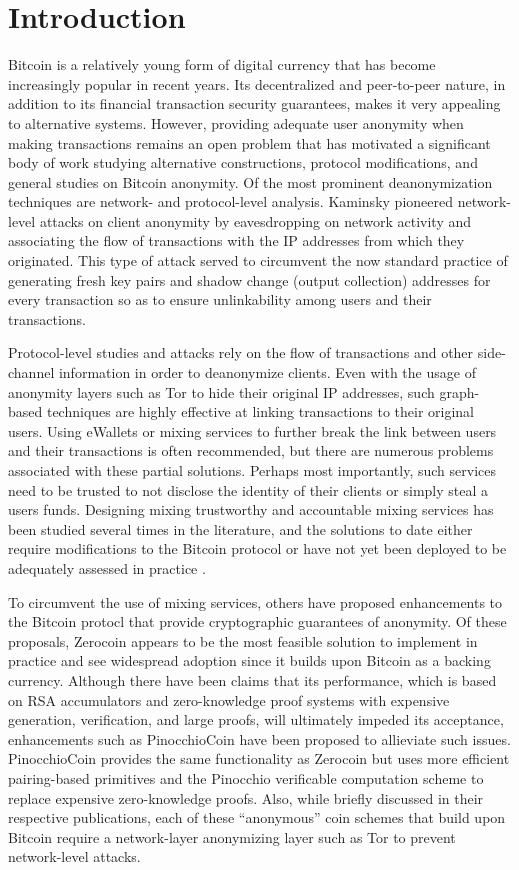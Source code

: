 \section{Introduction}
Bitcoin is a relatively young form of digital currency that has become increasingly popular in recent years. Its decentralized and peer-to-peer nature, in addition to its financial transaction security guarantees, makes it very appealing to alternative systems. However, providing adequate user anonymity when making transactions remains an open problem that has motivated a significant body of work studying alternative constructions, protocol modifications, and general studies on Bitcoin anonymity. Of the most prominent deanonymization techniques are network- and protocol-level analysis. Kaminsky \cite{kaminsky} pioneered network-level attacks on client anonymity by eavesdropping on network activity and associating the flow of transactions with the IP addresses from which they originated. This type of attack served to circumvent the now standard practice of generating fresh key pairs and shadow change (output collection) addresses for every transaction so as to ensure unlinkability among users and their transactions. 

Protocol-level studies and attacks rely on the flow of transactions and other side-channel information in order to deanonymize clients. Even with the usage of anonymity layers such as Tor to hide their original IP addresses, such graph-based techniques are highly effective at linking transactions to their original users. Using eWallets or mixing services to further break the link between users and their transactions is often recommended, but there are numerous problems associated with these partial solutions. Perhaps most importantly, such services need to be trusted to not disclose the identity of their clients or simply steal a users funds. Designing mixing trustworthy and accountable mixing services has been studied several times in the literature, and the solutions to date either require modifications to the Bitcoin protocol \cite{BitterToBetter} or have not yet been deployed to be adequately assessed in practice \cite{mixcoin}.

To circumvent the use of mixing services, others have proposed enhancements to the Bitcoin protocl that provide cryptographic guarantees of anonymity. Of these proposals, Zerocoin \cite{zerocoin} appears to be the most feasible solution to implement in practice and see widespread adoption since it builds upon Bitcoin as a backing currency. Although there have been claims that its performance, which is based on RSA accumulators and zero-knowledge proof systems with expensive generation, verification, and large proofs, will ultimately impeded its acceptance, enhancements such as PinocchioCoin \cite{pinocchio} have been proposed to allieviate such issues. PinocchioCoin provides the same functionality as Zerocoin but uses more efficient pairing-based primitives and the Pinocchio verificable computation scheme to replace expensive zero-knowledge proofs. Also, while briefly discussed in their respective publications, each of these ``anonymous'' coin schemes that build upon Bitcoin require a network-layer anonymizing layer such as Tor to prevent network-level attacks.

